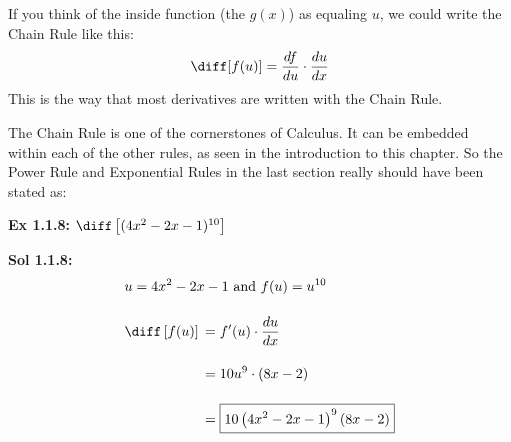 \begin{center}
\end{center}

If you think of the inside function (the $g(x)$) as equaling $u$, we could write the Chain Rule like this: \begin{align*}
    \diff [f(u)] = \dfrac{df}{du} \cdot \dfrac{du}{dx}
\end{align*}
This is the way that most derivatives are written with the Chain Rule. \par

The Chain Rule is one of the cornerstones of Calculus. It can be embedded within each of the other rules, as seen in the introduction to this chapter. So the Power Rule and Exponential Rules in the last section really should have been stated as: 


\begin{tcolorbox}[example]
    \textbf{Ex 1.1.8: } $\diff \left[(4x^2 - 2x - 1)^{10}\right]$ 
\end{tcolorbox}
\begin{tcolorbox}[solution]
    \textbf{Sol 1.1.8: } \begin{align*}
        & u = 4x^2 - 2x - 1 \text{ and } f(u) = u^{10} \\[11pt]
        & \diff \left[f(u)\right] \begin{aligned}[t]
            & = f'(u) \cdot \dfrac{du}{dx} \\[11pt] 
            & = 10u^9 \cdot \left(8x - 2\right) \\[11pt]
            & = \boxed{10\left(4x^2 - 2x - 1\right)^9(8x - 2)} 
        \end{aligned}
    \end{align*}
\end{tcolorbox} \vspace{11pt}

